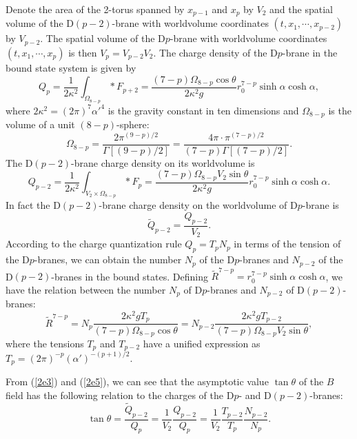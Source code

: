 \documentclass[a4paper,12pt]{article}
\begin{document}
Denote the area of the 2-torus spanned by $x_{p-1}$ and $x_p$ by $V_2$ and
the spatial volume of the D$(p-2)$-brane with worldvolume coordinates $(t,
x_1, \cdots, x_{p-2})$ by $V_{p-2}$. The spatial volume of the D$p$-brane
with worldvolume coordinates $(t, x_1, \cdots, x_p)$ is then
$V_p=V_{p-2}V_2$. The charge density of the D$p$-brane in the bound
state system is given by
\begin{equation}
\label{2e3}
Q_p =\frac{1}{2\kappa^2}\int_{\Omega_{8-p}}*F_{p+2}
 =\frac{(7-p)\Omega_{8-p} \cos\theta}{2\kappa^2 g}r_0^{7-p}
  \sinh\alpha \cosh\alpha,
\end{equation}
where $2\kappa^2 =(2\pi)^7 \alpha'^4$ is the gravity constant in ten
dimensions and $\Omega_{8-p}$ is the volume of a unit $(8-p)$-sphere:
\begin{equation}
\Omega_{8-p}=\frac{2\pi^{(9-p)/2}}{\Gamma[(9-p)/2]}=\frac{4\pi\cdot
  \pi ^{(7-p)/2}}{(7-p)\Gamma[(7-p)/2]}.
\end{equation}
The D$(p-2)$-brane charge density on its worldvolume is
\begin{equation}
Q_{p-2}=\frac{1}{2\kappa^2}\int_{V_2\times\Omega_{8-p}}*F_p
    =\frac{(7-p)\Omega_{8-p}V_2 \sin \theta}{2\kappa^2 g}
      r_0^{7-p}\sinh\alpha\cosh\alpha .
\label{2e5}
\end{equation}
In fact the D$(p-2)$-brane charge density on the worldvolume of D$p$-brane is
\begin{equation}
\tilde{Q}_{p-2}=\frac{Q_{p-2}}{V_2}.
\end{equation}
According to the charge quantization rule $Q_p=T_pN_p$ in terms of the
tension of the D$p$-branes, we can obtain the number $N_p$ of the D$p$-branes
and $N_{p-2}$ of the D$(p-2)$-branes in the bound states. Defining
$\tilde{R}^{7-p}=r_0^{7-p}\sinh\alpha\cosh\alpha$, we have the relation
between the number $N_p$ of D$p$-branes and $N_{p-2}$ of D$(p-2)$-branes:
\begin{equation}
\tilde{R}^{7-p} = N_p\frac{2\kappa^2 gT_p}{(7-p)\Omega_{8-p}\cos\theta}
 =N_{p-2}\frac{2\kappa^2 gT_{p-2}}{(7-p)\Omega_{8-p}V_2\sin\theta},
\end{equation}
where the tensions $T_p$ and $T_{p-2}$ have a unified expression as
$T_p=(2\pi)^{-p}(\alpha')^{-(p+1)/2}$.

{}From (\ref{2e3}) and (\ref{2e5}), we can see that the asymptotic
value $\tan \theta $ of the $B$ field has the following relation to the
charges of the D$p$- and D$(p-2)$-branes:
\begin{equation}
\label{2e7}
\tan\theta =\frac{\tilde{Q}_{p-2}}{Q_p}=\frac{1}{V_2}\frac{Q_{p-2}}{Q_p}
=\frac{1}{V_2}\frac{T_{p-2}}{T_p}\frac{N_{p-2}}{N_p}.
\end{equation}
\end{document}
